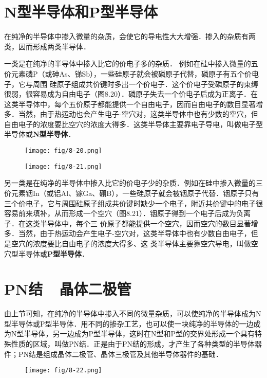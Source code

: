 \section{N型半导体和P型半导体}
在纯净的半导体中掺入微量的杂质，会使它的导电性大大增强．掺入的杂质有两类，因而形成两类半导体．

一类是在纯净的半导体中掺入比它的价电子多的杂质．
例如在硅中掺入微量的五价元素磷P（或砷As、锑Sb），一些硅原子就会被磷原子代替，磷原子有五个价电子，它与周围
硅原子组成共价键时多出一个价电子．这个价电子受磷原子的束缚很弱，很容易成为自由电子（图8.20）．磷原子失去一个价电子后成为正离子．在这类半导体中，每个五价原子都能提供一个自由电子，因而自由电子的数目显著增多．当然，由于热运动也会产生电子-空穴对，这类半导体中也有少数的空穴，但自由电子的浓度要比空穴的浓度大得多．这类半导体主要靠电子导电，叫做电子型半导体或\textbf{N型半导体}．
\begin{figure}[htp]
    \centering
    \begin{minipage}[t]{0.48\textwidth}
    \centering
    \texttt{[image: fig/8-20.png]}
    \caption{}
    \end{minipage}
    \begin{minipage}[t]{0.48\textwidth}
    \centering
    \texttt{[image: fig/8-21.png]}
    \caption{}
    \end{minipage}
    \end{figure}

另一类是在纯净的半导体中掺入比它的价电子少的杂质．例如在硅中掺入微量的三价元素铟In（或铝Al、镓Ga、硼B），一些硅原子就会被铟原子代替．铟原子只有三个价电子，它与周围硅原子组成共价键时缺少一个电子，附近共价键中的电子很容易前来填补，从而形成一个空穴（图8.21）．铟原子得到一个电子后成为负离子．在这类半导体中，每个三
价原子都能提供一个空穴，因而空穴的数目显著增多．当然，由于热运动会产生电子-空穴对，这类半导体中也有少数自由电子，但是空穴的浓度要比自由电子的浓度大得多、这
类半导体主要靠空穴导电，叫做空穴型半导体或\textbf{P型半导体}．

\section{PN结~~晶体二极管}
由上节可知，在纯净的半导体中掺入不同的微量杂质，可以使纯净的半导体成为N型半导体或P型半导体．用不同的掺杂工艺，也可以使一块纯净的半导体的一边成为N型半导体，另一边成为P型半导体，这时在N型和P型的交界处形成一个具有特殊性质的区域，叫做PN结．正是由于PN结的形成，才产生了各种类型的半导体器件；PN结是组成晶体二极管、晶体三极管及其他半导体器件的基础．
\begin{figure}[htp]\centering
    \texttt{[image: fig/8-22.png]}
    \caption{}
    \end{figure}

